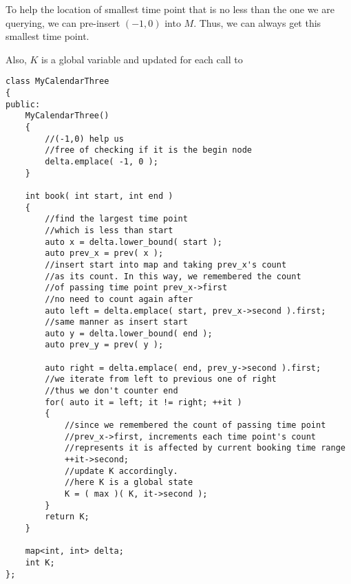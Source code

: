 To help the location of smallest time point that is no less than the one we are querying, we can pre-insert $(-1,0)$ into $M$. Thus, we can always get this smallest time point.

Also, $K$ is a global variable and updated for each call to 

\begin{lstlisting}[style=customc, caption={Counting Time Points}]
class MyCalendarThree
{
public:
    MyCalendarThree()
    {
        //(-1,0) help us
        //free of checking if it is the begin node
        delta.emplace( -1, 0 );
    }

    int book( int start, int end )
    {
        //find the largest time point
        //which is less than start
        auto x = delta.lower_bound( start );
        auto prev_x = prev( x );
        //insert start into map and taking prev_x's count
        //as its count. In this way, we remembered the count
        //of passing time point prev_x->first
        //no need to count again after
        auto left = delta.emplace( start, prev_x->second ).first;
        //same manner as insert start
        auto y = delta.lower_bound( end );
        auto prev_y = prev( y );

        auto right = delta.emplace( end, prev_y->second ).first;
        //we iterate from left to previous one of right
        //thus we don't counter end
        for( auto it = left; it != right; ++it )
        {
            //since we remembered the count of passing time point
            //prev_x->first, increments each time point's count
            //represents it is affected by current booking time range
            ++it->second;
            //update K accordingly.
            //here K is a global state
            K = ( max )( K, it->second );
        }
        return K;
    }

    map<int, int> delta;
    int K;
};
\end{lstlisting}